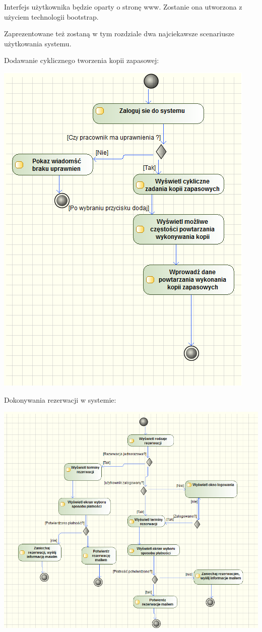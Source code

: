 \documentclass[paper=a4, fontsize=11pt]{scrartcl} %
\begin{document}
Interfejs użytkownika będzie oparty o stronę www.
Zostanie ona utworzona z użyciem technologii bootstrap.


Zaprezentowane też zostaną w tym rozdziale dwa najciekawsze scenariusze użytkowania systemu.

Dodawanie cyklicznego tworzenia kopii zapasowej:

\includegraphics[scale=0.7]{1}

Dokonywania rezerwacji w systemie:

\includegraphics[scale=0.7]{2}
\end{document}
